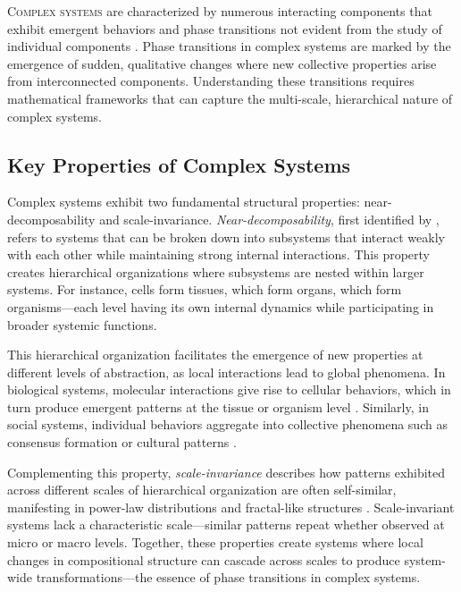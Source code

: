 \lettrine[lines=2, findent=3pt, nindent=0pt]{C}{omplex systems} are characterized by numerous interacting components that exhibit emergent behaviors and phase transitions not evident from the study of individual components \citep{mitchell2009complexity}. Phase transitions in complex systems are marked by the emergence of sudden, qualitative changes where new collective properties arise from interconnected components. Understanding these transitions requires mathematical frameworks that can capture the multi-scale, hierarchical nature of complex systems.

\subsection{Key Properties of Complex Systems}

Complex systems exhibit two fundamental structural properties: near-decomposability and scale-invariance. \textit{Near-decomposability}, first identified by \citet{simon1962architecture}, refers to systems that can be broken down into subsystems that interact weakly with each other while maintaining strong internal interactions. This property creates hierarchical organizations where subsystems are nested within larger systems. For instance, cells form tissues, which form organs, which form organisms—each level having its own internal dynamics while participating in broader systemic functions.

This hierarchical organization facilitates the emergence of new properties at different levels of abstraction, as local interactions lead to global phenomena. In biological systems, molecular interactions give rise to cellular behaviors, which in turn produce emergent patterns at the tissue or organism level \citep{battiston2020networks}. Similarly, in social systems, individual behaviors aggregate into collective phenomena such as consensus formation or cultural patterns \citep{castellano2009statistical}.

Complementing this property, \textit{scale-invariance} describes how patterns exhibited across different scales of hierarchical organization are often self-similar, manifesting in power-law distributions and fractal-like structures \citep{west2017scale}. Scale-invariant systems lack a characteristic scale—similar patterns repeat whether observed at micro or macro levels. Together, these properties create systems where local changes in compositional structure can cascade across scales to produce system-wide transformations—the essence of phase transitions in complex systems.

